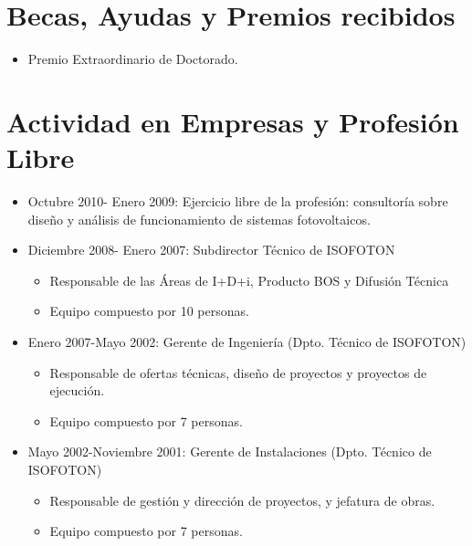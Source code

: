 \documentclass[article, a4paper]{memoir}
\begin{document}
\section{Becas, Ayudas y Premios recibidos}
\label{sec-10}

\begin{itemize}
\item Premio Extraordinario de Doctorado.
\end{itemize}

\section{Actividad en Empresas y Profesión Libre}
\label{sec-11}


\begin{itemize}
\item Octubre 2010- Enero 2009: Ejercicio libre de la profesión:
consultoría sobre diseño y análisis de funcionamiento de
sistemas fotovoltaicos.

\item Diciembre 2008- Enero 2007: Subdirector Técnico de ISOFOTON

\begin{itemize}
\item Responsable de las Áreas de I+D+i, Producto BOS y Difusión
Técnica
\item Equipo compuesto por 10 personas.
\end{itemize}
\end{itemize}


\begin{itemize}
\item Enero 2007-Mayo 2002: Gerente de Ingeniería (Dpto. Técnico de
ISOFOTON)

\begin{itemize}
\item Responsable de ofertas técnicas, diseño de proyectos y
proyectos de ejecución.
\item Equipo compuesto por 7 personas.
\end{itemize}
\end{itemize}


\begin{itemize}
\item Mayo 2002-Noviembre 2001: Gerente de Instalaciones
(Dpto. Técnico de ISOFOTON)

\begin{itemize}
\item Responsable de gestión y dirección de proyectos, y jefatura de
obras.
\item Equipo compuesto por 7 personas.
\end{itemize}
\end{itemize}
\end{document}
